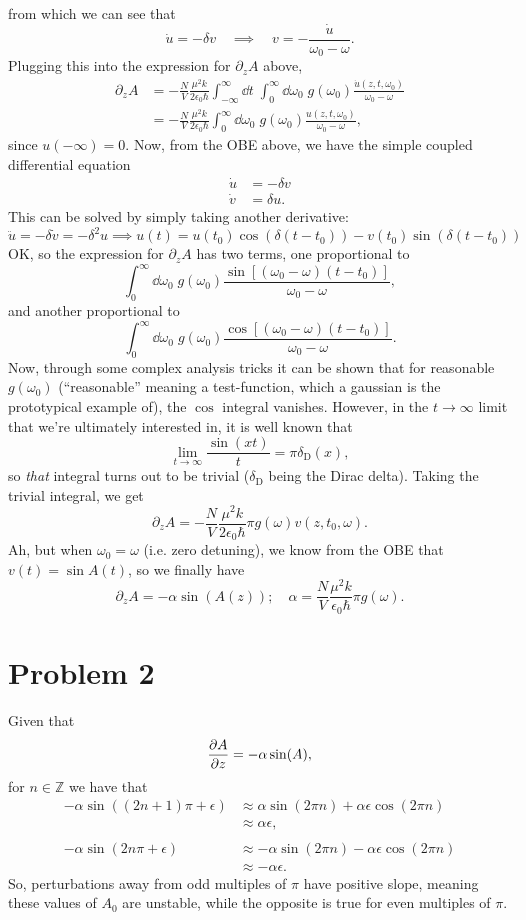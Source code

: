 \documentclass[12pt]{article}
\newcommand{\fullint}[1][x]{\int_{-\infty}^{\infty}\dd #1\;}
\newcommand{\halfint}[1][x]{\int_{0}^{\infty}\dd #1\;}
\begin{document}
from which we can see that
\[ \dot{u} = -\delta v \quad\implies\quad v = -\frac{\dot{u}}{\omega_0-\omega}. \]
Plugging this into the expression for $\partial_z A$ above,
\begin{align*}
	\partial_zA &= -\frac{N}{V}\frac{\mu^2k}{2\epsilon_0\hbar}\fullint[t]\halfint[\omega_0]g(\omega_0)\frac{\dot{u}(z,t,\omega_0)}{\omega_0-\omega} \\
	&= -\frac{N}{V}\frac{\mu^2k}{2\epsilon_0\hbar}\halfint[\omega_0]g(\omega_0)\frac{u(z,t,\omega_0)}{\omega_0-\omega},
\end{align*}
since $u(-\infty)=0$. Now, from the OBE above, we have the simple coupled differential equation
\begin{align*}
	\dot{u} &= -\delta v\\
	\dot{v} &= \delta u.
\end{align*}
This can be solved by simply taking another derivative:
\[ \ddot{u} = -\delta \dot{v} = -\delta^2 u \implies u(t) = u(t_0)\cos(\delta(t-t_0)) - v(t_0)\sin(\delta(t-t_0)) \]
OK, so the expression for $\partial_zA$ has two terms, one proportional to
\[ \halfint[\omega_0]g(\omega_0)\frac{\sin[(\omega_0-\omega)(t-t_0)]}{\omega_0-\omega}, \]
and another proportional to
\[ \halfint[\omega_0]g(\omega_0)\frac{\cos[(\omega_0-\omega)(t-t_0)]}{\omega_0-\omega}. \]
Now, through some complex analysis tricks it can be shown that for reasonable $g(\omega_0)$ (``reasonable'' meaning a test-function, which a gaussian is the prototypical example of), the $\cos$ integral vanishes.
However, in the $t\to\infty$ limit that we're ultimately interested in, it is well known that
\[ \lim_{t\to\infty}\frac{\sin(xt)}{t} = \pi\delta_\text{D}(x), \]
so \textit{that} integral turns out to be trivial ($\delta_\text{D}$ being the Dirac delta). Taking the trivial integral, we get
\[ \partial_zA = -\frac{N}{V}\frac{\mu^2k}{2\epsilon_0\hbar}\pi g(\omega)v(z,t_0,\omega). \]
Ah, but when $\omega_0 = \omega$ (i.e. zero detuning), we know from the OBE that $v(t) = \sin A(t)$, so we finally have
\[ \partial_zA = -\alpha \sin(A(z)); \quad \alpha = \frac{N}{V}\frac{\mu^2k}{\epsilon_0\hbar}\pi g(\omega). \]

\section*{Problem 2}
Given that
\[ \pdv{A}{z} = -\alpha \sin(A), \]
for $n \in \mathbb{Z}$ we have that
\begin{align*}
	-\alpha\sin((2n + 1)\pi + \epsilon) &\approx \alpha\sin(2\pi n) + \alpha\epsilon\cos(2\pi n) \\
	&\approx \alpha\epsilon, \\
	\\
	-\alpha\sin(2n\pi + \epsilon) &\approx -\alpha\sin(2\pi n) - \alpha\epsilon\cos(2 \pi n) \\
	&\approx -\alpha\epsilon.
\end{align*}
So, perturbations away from odd multiples of $\pi$ have positive slope, meaning these values of $A_0$ are unstable, while the opposite is true for even multiples of $\pi$.
\end{document}
